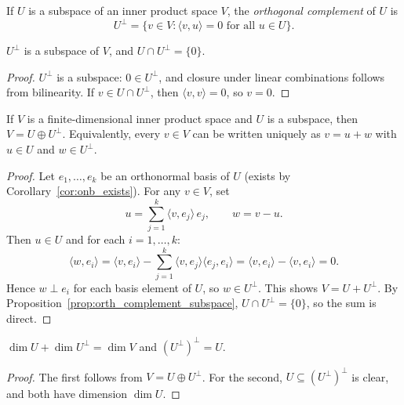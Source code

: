 \documentclass[11pt,a4paper]{article}
\begin{document}
\begin{definition}
\label{def:orth_complement}
If $U$ is a subspace of an inner product space $V$, the \emph{orthogonal
complement} of $U$ is
\[
  U^\perp = \{v \in V : \langle v, u \rangle = 0 \text{ for all } u \in U\}.
\]
\end{definition}

\begin{proposition}
\label{prop:orth_complement_subspace}
$U^\perp$ is a subspace of $V$, and $U \cap U^\perp = \{0\}$.
\end{proposition}

\begin{proof}
$U^\perp$ is a subspace: $0 \in U^\perp$, and closure under linear
combinations follows from bilinearity.  If $v \in U \cap U^\perp$, then
$\langle v, v \rangle = 0$, so $v = 0$.
\end{proof}

\begin{theorem}
\label{thm:orth_decomp}
If $V$ is a finite-dimensional inner product space and $U$ is a subspace,
then $V = U \oplus U^\perp$.  Equivalently, every $v \in V$ can be
written uniquely as $v = u + w$ with $u \in U$ and $w \in U^\perp$.
\end{theorem}

\begin{proof}
Let $e_1, \ldots, e_k$ be an orthonormal basis of $U$ (exists by
Corollary~\ref{cor:onb_exists}).  For any $v \in V$, set
\[
  u = \sum_{j=1}^{k} \langle v, e_j \rangle\, e_j, \qquad
  w = v - u.
\]
Then $u \in U$ and for each $i = 1, \ldots, k$:
\[
  \langle w, e_i \rangle
  = \langle v, e_i \rangle - \sum_{j=1}^{k} \langle v, e_j \rangle
    \langle e_j, e_i \rangle
  = \langle v, e_i \rangle - \langle v, e_i \rangle = 0.
\]
Hence $w \perp e_i$ for each basis element of $U$, so $w \in U^\perp$.
This shows $V = U + U^\perp$.  By Proposition~\ref{prop:orth_complement_subspace},
$U \cap U^\perp = \{0\}$, so the sum is direct.
\end{proof}

\begin{corollary}
\label{cor:dim_orth}
$\dim U + \dim U^\perp = \dim V$ and $(U^\perp)^\perp = U$.
\end{corollary}

\begin{proof}
The first follows from $V = U \oplus U^\perp$.  For the second,
$U \subseteq (U^\perp)^\perp$ is clear, and both have dimension $\dim U$.
\end{proof}
\end{document}
